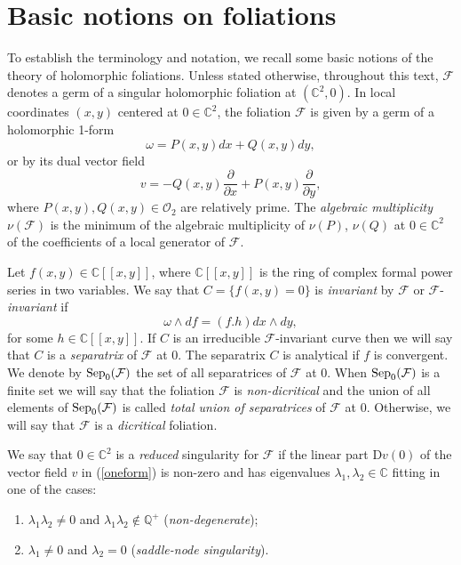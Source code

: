\documentclass[12pt,letterpaper]{amsart}
\newcommand{\C}{\mathbb{C}}
\newcommand{\F}{\mathcal{F}}
\newcommand{\sep}{\mbox{\rm Sep}}
\begin{document}
\section{Basic notions on foliations}\label{basic_fol}

\par  To establish the terminology and notation, we recall  some basic notions of the theory of holomorphic foliations. Unless stated otherwise, throughout this text, $\F$ denotes a germ of a singular holomorphic foliation at $(\C^2,0)$. In local coordinates $(x,y)$ centered at $0\in\C^2$, the foliation $\F$ is given by a germ of a holomorphic 1-form
\begin{equation*}
\omega=P(x,y)dx+Q(x,y)dy,
\end{equation*}
or by its dual vector field
\begin{equation}\label{oneform}
v = -Q(x,y)\frac{\partial}{\partial{x}} + P(x,y)\frac{\partial}{\partial{y}},
\end{equation}
where  $P(x,y), Q(x,y)   \in \mathcal{O}_2$ are relatively prime. 
 The \textit{algebraic multiplicity} $\nu(\F)$ is the minimum of the algebraic multiplicity of $\nu(P)$, $\nu(Q)$ at $0\in\C^2$ of the coefficients of a local generator of $\F$. 
\par Let $f(x,y)\in  \mathbb{C}[[x,y]]$, where ${\mathbb C}[[x,y]]$ is the ring of complex formal power series in two variables.  
We say that $C=\{ f(x,y)=0\}$  is {\em invariant} by $\F$ or $\F$-\emph{invariant} if $$\omega \wedge d f=(f.h) dx \wedge dy,$$ for some $h\in \mathbb{C}[[x,y]]$. If $C$ is an irreducible $\F$-invariant curve then we will say that $C$ is a {\em separatrix} of $\F$ at $0$. The separatrix $C$ is analytical if $f$ is convergent.  We denote by $\sep_0(\F)$ the set of all separatrices of $\F$ at $0$. When $\sep_0(\F)$ is a finite set we will say that the foliation $\F$ is {\em non-dicritical} and the union of all elements of $\sep_0(\F)$ is called {\em total union of separatrices} of $\F$ at $0$. Otherwise, we will say that $\F$ is a {\em dicritical} foliation.
\par We say that $0\in\C^2$ is a \textit{reduced} singularity for $\F$ if the linear part $\text{D}v(0)$ of the vector field $v$ in (\ref{oneform}) is non-zero and has eigenvalues $\lambda_1,\lambda_2\in\C$ fitting in one of the cases:
\begin{enumerate}
\item[(i)] $\lambda_1\lambda_2\neq 0$ and $\lambda_1\lambda_2\not\in\mathbb{Q}^{+}$ (\textit{non-degenerate});
\item[(ii)] $\lambda_1\neq 0$ and $\lambda_2= 0$ (\textit{saddle-node singularity}).
\end{enumerate}
\end{document}
